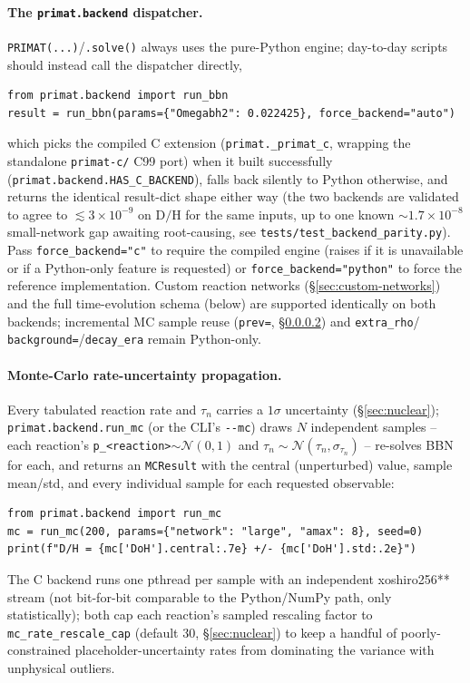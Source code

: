 \documentclass[11pt,a4paper]{article}
\newcommand{\DoH}{\mathrm{D/H}}
\newcommand{\code}[1]{\texttt{#1}}
\begin{document}
\paragraph{The \code{primat.backend} dispatcher.}\label{sec:backends}
\code{PRIMAT(...)}/\code{.solve()} always uses the pure-Python engine;
day-to-day scripts should instead call the dispatcher directly,
\begin{lstlisting}[style=py]
from primat.backend import run_bbn
result = run_bbn(params={"Omegabh2": 0.022425}, force_backend="auto")
\end{lstlisting}
which picks the compiled C extension (\code{primat.\_primat\_c}, wrapping the
standalone \code{primat-c/} C99 port) when it built successfully
(\code{primat.backend.HAS\_C\_BACKEND}), falls back silently to Python
otherwise, and returns the identical result-dict shape either way (the two
backends are validated to agree to $\lesssim3\times10^{-9}$ on $\DoH$ for the
same inputs, up to one known $\sim1.7\times10^{-8}$ small-network gap awaiting
root-causing, see \code{tests/test\_backend\_parity.py}). Pass
\code{force\_backend="c"} to require the compiled engine (raises if it is
unavailable or if a Python-only feature is requested) or
\code{force\_backend="python"} to force the reference implementation. Custom
reaction networks (\S\ref{sec:custom-networks}) and the full time-evolution
schema (below) are supported identically on both backends; incremental MC
sample reuse (\code{prev=}, \S\ref{sec:mc-usage}) and \code{extra\_rho}/
\code{background=}/\code{decay\_era} remain Python-only.

\paragraph{Monte-Carlo rate-uncertainty propagation.}\label{sec:mc-usage}
Every tabulated reaction rate and $\tau_n$ carries a $1\sigma$ uncertainty
(\S\ref{sec:nuclear}); \code{primat.backend.run\_mc} (or the CLI's
\code{-{}-mc}) draws $N$ independent samples -- each reaction's
\code{p\_<reaction>}$\sim\mathcal N(0,1)$ and $\tau_n\sim\mathcal
N(\tau_n,\sigma_{\tau_n})$ -- re-solves BBN for each, and returns an
\code{MCResult} with the central (unperturbed) value, sample mean/std, and
every individual sample for each requested observable:
\begin{lstlisting}[style=py]
from primat.backend import run_mc
mc = run_mc(200, params={"network": "large", "amax": 8}, seed=0)
print(f"D/H = {mc['DoH'].central:.7e} +/- {mc['DoH'].std:.2e}")
\end{lstlisting}
The C backend runs one pthread per sample with an independent
xoshiro256** stream (not bit-for-bit comparable to the Python/NumPy path,
only statistically); both cap each reaction's sampled rescaling factor to
\code{mc\_rate\_rescale\_cap} (default 30, \S\ref{sec:nuclear}) to keep a
handful of poorly-constrained placeholder-uncertainty rates from dominating
the variance with unphysical outliers.
\end{document}
